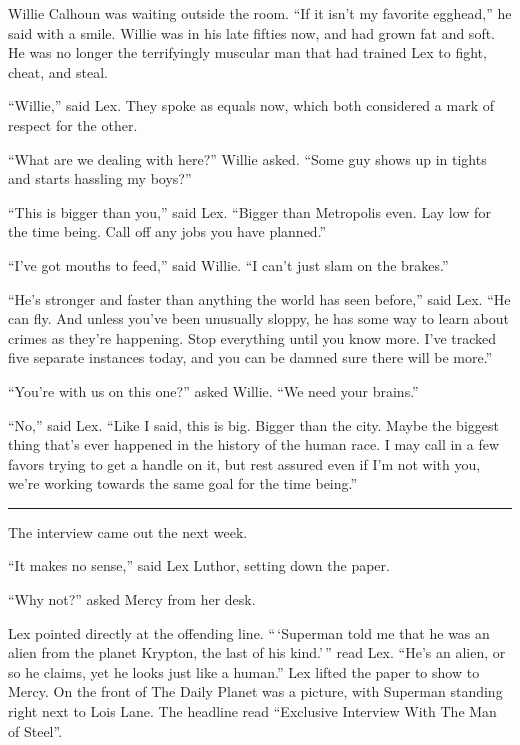 Willie Calhoun was waiting outside the room. ``If it isn't my favorite
egghead,'' he said with a smile. Willie was in his late fifties now, and
had grown fat and soft. He was no longer the terrifyingly muscular man
that had trained Lex to fight, cheat, and steal.

``Willie,'' said Lex. They spoke as equals now, which both considered a
mark of respect for the other.

``What are we dealing with here?'' Willie asked. ``Some guy shows up in
tights and starts hassling my boys?''

``This is bigger than you,'' said Lex. ``Bigger than Metropolis even.
Lay low for the time being. Call off any jobs you have planned.''

``I've got mouths to feed,'' said Willie. ``I can't just slam on the
brakes.''

``He's stronger and faster than anything the world has seen before,''
said Lex. ``He can fly. And unless you've been unusually sloppy, he has
some way to learn about crimes as they're happening. Stop everything
until you know more. I've tracked five separate instances today, and you
can be damned sure there will be more.''

``You're with us on this one?'' asked Willie. ``We need your brains.''

``No,'' said Lex. ``Like I said, this is big. Bigger than the city.
Maybe the biggest thing that's ever happened in the history of the human
race. I may call in a few favors trying to get a handle on it, but rest
assured even if I'm not with you, we're working towards the same goal
for the time being.''

\begin{center}\rule{0.5\linewidth}{\linethickness}\end{center}

The interview came out the next week.

``It makes no sense,'' said Lex Luthor, setting down the paper.

``Why not?'' asked Mercy from her desk.

Lex pointed directly at the offending line. ``\,`Superman told me that
he was an alien from the planet Krypton, the last of his kind.'\,'' read
Lex. ``He's an alien, or so he claims, yet he looks just like a human.''
Lex lifted the paper to show to Mercy. On the front of The Daily Planet
was a picture, with Superman standing right next to Lois Lane. The
headline read ``Exclusive Interview With The Man of Steel''.

